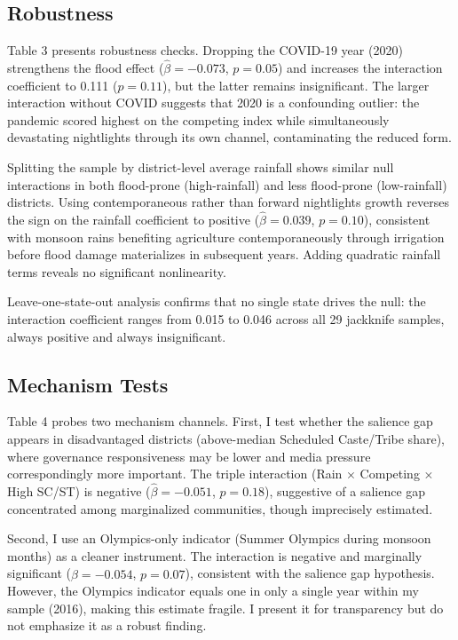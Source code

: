 \documentclass[12pt]{article}
\begin{document}
\subsection{Robustness}

{\footnotesize}

Table 3 presents robustness checks. Dropping the COVID-19 year (2020) strengthens the flood effect ($\hat{\beta} = -0.073$, $p = 0.05$) and increases the interaction coefficient to 0.111 ($p = 0.11$), but the latter remains insignificant. The larger interaction without COVID suggests that 2020 is a confounding outlier: the pandemic scored highest on the competing index while simultaneously devastating nightlights through its own channel, contaminating the reduced form.

Splitting the sample by district-level average rainfall shows similar null interactions in both flood-prone (high-rainfall) and less flood-prone (low-rainfall) districts. Using contemporaneous rather than forward nightlights growth reverses the sign on the rainfall coefficient to positive ($\hat{\beta} = 0.039$, $p = 0.10$), consistent with monsoon rains benefiting agriculture contemporaneously through irrigation before flood damage materializes in subsequent years. Adding quadratic rainfall terms reveals no significant nonlinearity.

Leave-one-state-out analysis confirms that no single state drives the null: the interaction coefficient ranges from 0.015 to 0.046 across all 29 jackknife samples, always positive and always insignificant.

\subsection{Mechanism Tests}

{\footnotesize}

Table 4 probes two mechanism channels. First, I test whether the salience gap appears in disadvantaged districts (above-median Scheduled Caste/Tribe share), where governance responsiveness may be lower and media pressure correspondingly more important. The triple interaction (Rain $\times$ Competing $\times$ High SC/ST) is negative ($\hat{\beta} = -0.051$, $p = 0.18$), suggestive of a salience gap concentrated among marginalized communities, though imprecisely estimated.

Second, I use an Olympics-only indicator (Summer Olympics during monsoon months) as a cleaner instrument. The interaction is negative and marginally significant ($\hat{\beta} = -0.054$, $p = 0.07$), consistent with the salience gap hypothesis. However, the Olympics indicator equals one in only a single year within my sample (2016), making this estimate fragile. I present it for transparency but do not emphasize it as a robust finding.
\end{document}
